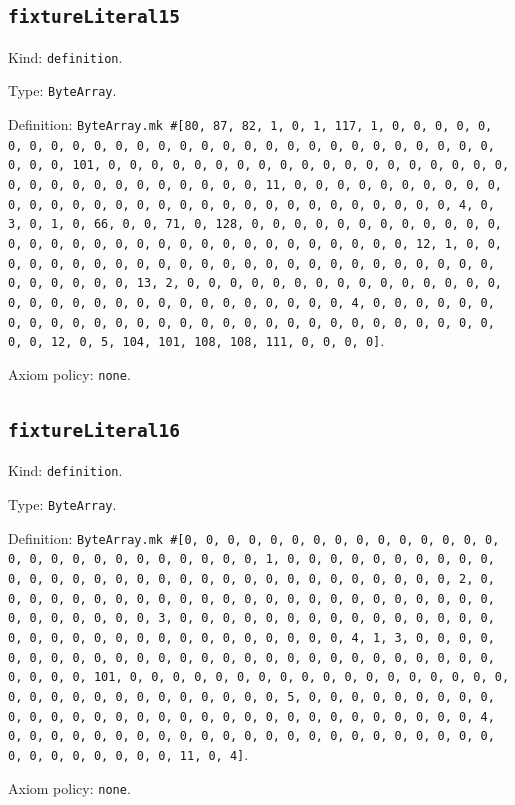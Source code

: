 \documentclass[11pt]{article}
\begin{document}
\subsection*{\texttt{fixtureLiteral15}}
\noindent Kind: \texttt{definition}.\par
\noindent Type: \texttt{ByteArray}.\par
\noindent Definition: \texttt{ByteArray.mk \#[80, 87, 82, 1, 0, 1, 117, 1, 0, 0, 0, 0, 0, 0, 0, 0, 0, 0, 0, 0, 0, 0, 0, 0, 0, 0, 0, 0, 0, 0, 0, 0, 0, 0, 0, 0, 0, 0, 0, 101, 0, 0, 0, 0, 0, 0, 0, 0, 0, 0, 0, 0, 0, 0, 0, 0, 0, 0, 0, 0, 0, 0, 0, 0, 0, 0, 0, 0, 0, 0, 0, 11, 0, 0, 0, 0, 0, 0, 0, 0, 0, 0, 0, 0, 0, 0, 0, 0, 0, 0, 0, 0, 0, 0, 0, 0, 0, 0, 0, 0, 0, 0, 0, 4, 0, 3, 0, 1, 0, 66, 0, 0, 71, 0, 128, 0, 0, 0, 0, 0, 0, 0, 0, 0, 0, 0, 0, 0, 0, 0, 0, 0, 0, 0, 0, 0, 0, 0, 0, 0, 0, 0, 0, 0, 0, 0, 12, 1, 0, 0, 0, 0, 0, 0, 0, 0, 0, 0, 0, 0, 0, 0, 0, 0, 0, 0, 0, 0, 0, 0, 0, 0, 0, 0, 0, 0, 0, 0, 0, 13, 2, 0, 0, 0, 0, 0, 0, 0, 0, 0, 0, 0, 0, 0, 0, 0, 0, 0, 0, 0, 0, 0, 0, 0, 0, 0, 0, 0, 0, 0, 0, 0, 4, 0, 0, 0, 0, 0, 0, 0, 0, 0, 0, 0, 0, 0, 0, 0, 0, 0, 0, 0, 0, 0, 0, 0, 0, 0, 0, 0, 0, 0, 0, 0, 12, 0, 5, 104, 101, 108, 108, 111, 0, 0, 0, 0]}.\par
\noindent Axiom policy: \texttt{none}.\par
\subsection*{\texttt{fixtureLiteral16}}
\noindent Kind: \texttt{definition}.\par
\noindent Type: \texttt{ByteArray}.\par
\noindent Definition: \texttt{ByteArray.mk \#[0, 0, 0, 0, 0, 0, 0, 0, 0, 0, 0, 0, 0, 0, 0, 0, 0, 0, 0, 0, 0, 0, 0, 0, 0, 0, 0, 1, 0, 0, 0, 0, 0, 0, 0, 0, 0, 0, 0, 0, 0, 0, 0, 0, 0, 0, 0, 0, 0, 0, 0, 0, 0, 0, 0, 0, 0, 0, 0, 2, 0, 0, 0, 0, 0, 0, 0, 0, 0, 0, 0, 0, 0, 0, 0, 0, 0, 0, 0, 0, 0, 0, 0, 0, 0, 0, 0, 0, 0, 0, 0, 3, 0, 0, 0, 0, 0, 0, 0, 0, 0, 0, 0, 0, 0, 0, 0, 0, 0, 0, 0, 0, 0, 0, 0, 0, 0, 0, 0, 0, 0, 0, 0, 4, 1, 3, 0, 0, 0, 0, 0, 0, 0, 0, 0, 0, 0, 0, 0, 0, 0, 0, 0, 0, 0, 0, 0, 0, 0, 0, 0, 0, 0, 0, 0, 0, 0, 101, 0, 0, 0, 0, 0, 0, 0, 0, 0, 0, 0, 0, 0, 0, 0, 0, 0, 0, 0, 0, 0, 0, 0, 0, 0, 0, 0, 0, 0, 0, 0, 5, 0, 0, 0, 0, 0, 0, 0, 0, 0, 0, 0, 0, 0, 0, 0, 0, 0, 0, 0, 0, 0, 0, 0, 0, 0, 0, 0, 0, 0, 0, 0, 4, 0, 0, 0, 0, 0, 0, 0, 0, 0, 0, 0, 0, 0, 0, 0, 0, 0, 0, 0, 0, 0, 0, 0, 0, 0, 0, 0, 0, 0, 0, 0, 11, 0, 4]}.\par
\noindent Axiom policy: \texttt{none}.\par
\end{document}
